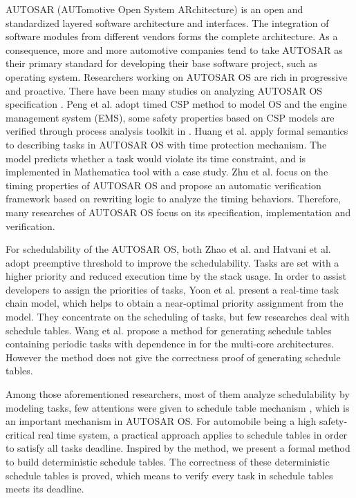 \documentclass[sigconf]{acmart}
\begin{document}
AUTOSAR (AUTomotive Open System ARchitecture) \cite{autosar} is an open and standardized layered software architecture and interfaces. The integration of software modules from different vendors forms the complete architecture. As a consequence, more and more automotive companies tend to take AUTOSAR as their primary standard for developing their base software project, such as operating system. Researchers working on AUTOSAR OS are rich in progressive and proactive. There have been many studies on analyzing AUTOSAR OS specification \cite{DBLP:conf/isorc/AnssiTKGT11}. Peng et al. adopt timed CSP method to model OS and the engine management system (EMS), some safety properties based on CSP models are verified through process analysis toolkit in \cite{DBLP:conf/tase/PengHSG13}. Huang et al. \cite{DBLP:conf/icfem/HuangFHQH13} apply formal semantics to describing tasks in AUTOSAR OS with time protection mechanism. The model predicts whether a task would violate its time constraint, and is implemented in Mathematica tool with a case study. Zhu et al. \cite{DBLP:conf/tase/ZhuLSWZ13} focus on the timing properties of AUTOSAR OS and propose an automatic verification framework based on rewriting logic to analyze the timing behaviors. Therefore, many researches of AUTOSAR OS focus on its specification, implementation and verification.

For schedulability of the AUTOSAR OS, both Zhao et al. \cite{DBLP:journals/jsa/ZhaoGZ17} and Hatvani et al. \cite{DBLP:conf/etfa/HatvaniB15} adopt preemptive threshold to improve the schedulability. Tasks are set with a higher priority and reduced execution time by the stack usage. In order to assist developers to assign the priorities of tasks, Yoon et al. \cite{DBLP:conf/racs/YoonR14} present a real-time task chain model, which helps to obtain a near-optimal priority assignment from the model. They concentrate on the scheduling of tasks, but few researches deal with schedule tables. Wang et al. propose a method for generating schedule tables containing periodic tasks with dependence in \cite{DBLP:conf/dasip/WangCM16} for the multi-core architectures. However the method does not give the correctness proof of generating schedule tables.

Among those aforementioned researchers, most of them analyze schedulability by modeling tasks, few attentions were given to schedule table mechanism \cite{autosar}, which is an important mechanism in AUTOSAR OS. For automobile being a high safety-critical real time system, a practical approach \cite{DBLP:journals/rts/BakerS89} applies to schedule tables in order to satisfy all tasks deadline. Inspired by the method, we present a formal method to build deterministic schedule tables. The correctness of these deterministic schedule tables is proved, which means to verify every task in schedule tables meets its deadline.
\end{document}
